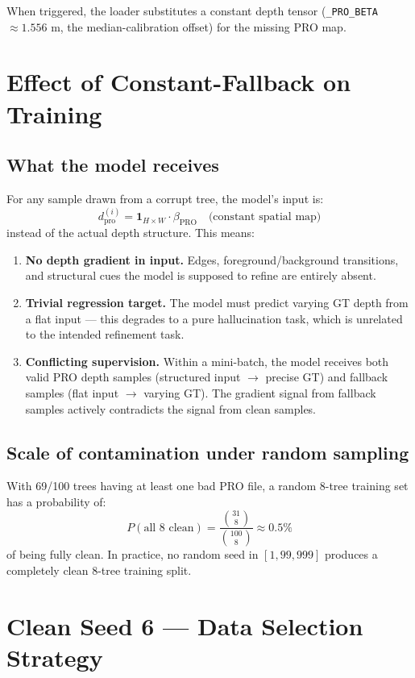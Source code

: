\documentclass[11pt]{article}
\begin{document}
When triggered, the loader substitutes a constant depth tensor
(\texttt{\_PRO\_BETA} $\approx 1.556$ m, the median-calibration offset) for
the missing PRO map.

\section{Effect of Constant-Fallback on Training}

\subsection*{What the model receives}

For any sample drawn from a corrupt tree, the model's input is:
\[
  d_{\text{pro}}^{(i)} = \mathbf{1}_{H \times W} \cdot \beta_{\text{PRO}}
  \quad \text{(constant spatial map)}
\]
instead of the actual depth structure.  This means:

\begin{enumerate}
  \item \textbf{No depth gradient in input.}  Edges, foreground/background
    transitions, and structural cues the model is supposed to refine are
    entirely absent.
  \item \textbf{Trivial regression target.}  The model must predict
    varying GT depth from a flat input — this degrades to a pure
    hallucination task, which is unrelated to the intended refinement task.
  \item \textbf{Conflicting supervision.}  Within a mini-batch, the model
    receives both valid PRO depth samples (structured input $\to$ precise GT)
    and fallback samples (flat input $\to$ varying GT).  The gradient signal
    from fallback samples actively contradicts the signal from clean samples.
\end{enumerate}

\subsection*{Scale of contamination under random sampling}

With 69/100 trees having at least one bad PRO file, a random 8-tree
training set has a probability of:
\[
  P(\text{all 8 clean}) = \frac{\binom{31}{8}}{\binom{100}{8}} \approx 0.5\%
\]
of being fully clean.  In practice, no random seed in $[1, 99{,}999]$
produces a completely clean 8-tree training split.

\section{Clean Seed 6 — Data Selection Strategy}
\end{document}
